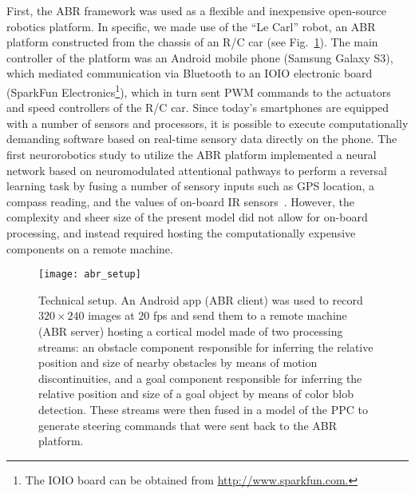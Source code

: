 First, the \acf{ABR} framework 
\citep{OrosKrichmar2012,OrosKrichmar2013a,OrosKrichmar2013b}
was used as a flexible and inexpensive open-source robotics platform. 
In specific, we made use of the ``Le Carl'' robot, an \ac{ABR}
platform constructed from the chassis of an R/C car 
(see Fig.~\ref{fig:ABR|setup}). 
The main controller of the platform was an
Android mobile phone (Samsung Galaxy S3), which mediated communication
via Bluetooth to an IOIO electronic board (SparkFun
Electronics\footnote{The IOIO board can be obtained from \url{http://www.sparkfun.com.}}), which in turn sent \ac{PWM}
commands to the actuators and speed controllers of the R/C car.
Since today's smartphones are equipped with a number of sensors
and processors, it is possible to execute computationally demanding
software based on real-time sensory data directly on the
phone. The first neurorobotics study to utilize the ABR platform implemented
a neural network based on neuromodulated attentional
pathways to perform a reversal learning task by fusing a number
of sensory inputs such as GPS location, a compass reading, and the
values of on-board IR sensors~\citep{OrosKrichmar2012}. However,
the complexity and sheer size of the present model did not allow
for on-board processing, and instead required hosting the computationally
expensive components on a remote machine.

\begin{figure}[t]
  \centering
  \texttt{[image: abr\_setup]}
  \caption{
  Technical setup. An Android app (ABR client) was used to record
  $320\times240$ images at $20$ fps and send them to a remote
  machine (ABR server) hosting a cortical model made of two
  processing streams: an obstacle component responsible for
  inferring the relative position and size of nearby obstacles
  by means of motion discontinuities, and a goal component
  responsible for inferring the relative position and size of a
  goal object by means of color blob detection.
  These streams were then fused in a model of the \acf{PPC} to
  generate steering commands that were sent back to the \ac{ABR}
  platform.}
  \label{fig:ABR|setup}
\end{figure}


